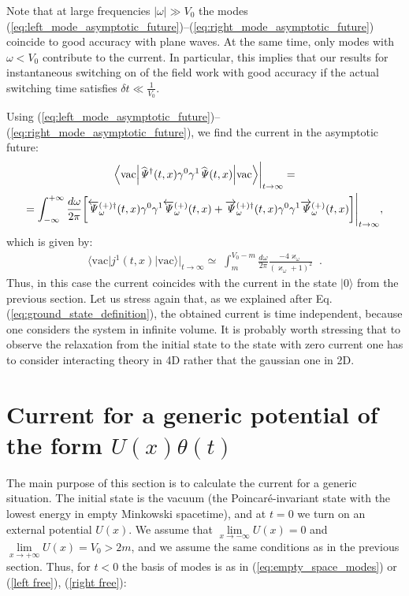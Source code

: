 \documentclass[12pt]{article}
\def\kappaw{\varkappa_{\omega}}
\def\w{\omega}
\numberwithin{equation}{section}
\begin{document}
Note that at large frequencies $|\w|\gg V_0$ the modes (\ref{eq:left_mode_asymptotic_future})–(\ref{eq:right_mode_asymptotic_future}) coincide to good accuracy with plane waves. At the same time, only modes with $\w<V_0$ contribute to the current. In particular, this implies that our results for instantaneous switching on of the field work with good accuracy if the actual switching time satisfies $\delta t \ll \frac{1}{V_0}$.

Using (\ref{eq:left_mode_asymptotic_future})–(\ref{eq:right_mode_asymptotic_future}), we find the current in the asymptotic future:
\begin{gather}
    \Big\langle\text{vac}\Big| \widehat{\mathit{\Psi}}^{\dagger}(t,x)\gamma^0\gamma^1\widehat{\mathit{\Psi}}(t,x)\Big|\text{vac}\Big\rangle\bigg|_{t\rightarrow\infty} =
    \\ \nonumber
    =\int_{-\infty}^{+\infty}\frac{d\w}{2\pi}\bigg[\overleftarrow{\mathit{\Psi}}\phantom{\empty}^{(+)\dagger}_{\w}(t,x) \gamma^0\gamma^1 \overleftarrow{\mathit{\Psi}}\phantom{\empty}^{(+)}_{\w}(t,x) + \overrightarrow{\mathit{\Psi}}\phantom{\empty}^{(+)\dagger}_{\w}(t,x) \gamma^0\gamma^1 \overrightarrow{\mathit{\Psi}}\phantom{\empty}^{(+)}_{\w}(t,x)\bigg]\Bigg|_{t\rightarrow\infty}, \end{gather}
which is given by: 
\begin{align}
\label{eq:current_asymptotic_future}
    \boxed{\Big\langle\text{vac}\Big|j^1(t,x)\Big|\text{vac}\Big\rangle\bigg|_{t\rightarrow\infty} \simeq \;
    \int_{m}^{V_0-m}\frac{d\w}{2\pi}\frac{-4\kappaw}{\left(\kappaw+1\right)^2}\;\;. }
\end{align}
Thus, in this case the current coincides with the current in the state $\Big|0\Big\rangle$ from the previous section. Let us stress again that, as we explained after Eq. (\ref{eq:ground_state_definition}), the obtained current is time independent, because one considers the system in infinite volume. It is probably worth stressing that to observe the relaxation from the initial state to the state with zero current one has to consider interacting theory in 4D rather that the gaussian one in 2D.


\section{Current for a generic potential of the form $U(x)\theta(t)$}
\label{Lapushkin}

The main purpose of this section is to calculate the current for a generic situation. The initial state is the vacuum (the Poincaré-invariant state with the lowest energy in empty Minkowski spacetime), and at $t=0$ we turn on an external potential $U(x)$. We assume that $\lim\limits_{x\rightarrow-\infty} U(x) = 0$ and $\lim\limits_{x\rightarrow+\infty} U(x) = V_0 > 2m$, and we assume the same conditions as in the previous section. Thus, for $t<0$ the basis of modes is as in (\ref{eq:empty_space_modes}) or (\ref{left free}), (\ref{right free}):
\end{document}
